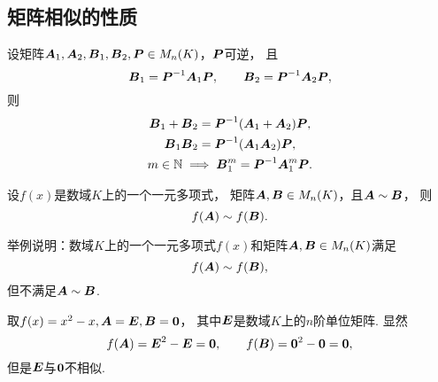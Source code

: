 \subsection{矩阵相似的性质}
\begin{proposition}
设矩阵\(\boldsymbol{A}_1,\boldsymbol{A}_2,\boldsymbol{B}_1,\boldsymbol{B}_2,\boldsymbol{P} \in M_n(K)\)，\(\boldsymbol{P}\)可逆，
且\begin{equation*}
	\boldsymbol{B}_1=\boldsymbol{P}^{-1}\boldsymbol{A}_1\boldsymbol{P}, \qquad
	\boldsymbol{B}_2=\boldsymbol{P}^{-1}\boldsymbol{A}_2\boldsymbol{P},
\end{equation*}
则\begin{gather}
	\boldsymbol{B}_1 + \boldsymbol{B}_2 = \boldsymbol{P}^{-1} (\boldsymbol{A}_1 + \boldsymbol{A}_2) \boldsymbol{P}, \\
	\boldsymbol{B}_1 \boldsymbol{B}_2 = \boldsymbol{P}^{-1} (\boldsymbol{A}_1 \boldsymbol{A}_2) \boldsymbol{P}, \\
	m\in\mathbb{N} \implies \boldsymbol{B}_1^m = \boldsymbol{P}^{-1}\boldsymbol{A}_1^m\boldsymbol{P}.
		\label{equation:相似矩阵.利用相似性简化计算}
\end{gather}
\end{proposition}
\begin{corollary}\label{theorem:相似矩阵.相似矩阵的多项式相似}
设\(f(x)\)是数域\(K\)上的一个一元多项式，
矩阵\(\boldsymbol{A},\boldsymbol{B} \in M_n(K)\)，且\(\boldsymbol{A} \sim \boldsymbol{B}\)，
则\begin{equation*}
	f(\boldsymbol{A}) \sim f(\boldsymbol{B}).
\end{equation*}
\end{corollary}
\begin{example}
举例说明：数域\(K\)上的一个一元多项式\(f(x)\)和矩阵\(\boldsymbol{A},\boldsymbol{B} \in M_n(K)\)满足\begin{equation*}
	f(\boldsymbol{A}) \sim f(\boldsymbol{B}),
\end{equation*}
但不满足\(\boldsymbol{A} \sim \boldsymbol{B}\).
\begin{solution}
取\(f(x) = x^2 - x,
\boldsymbol{A} = \boldsymbol{E},
\boldsymbol{B} = \boldsymbol0\)，
其中\(\boldsymbol{E}\)是数域\(K\)上的\(n\)阶单位矩阵.
显然\begin{equation*}
	f(\boldsymbol{A}) = \boldsymbol{E}^2 - \boldsymbol{E} = \boldsymbol0,
	\qquad
	f(\boldsymbol{B}) = \boldsymbol0^2 - \boldsymbol0 = \boldsymbol0,
\end{equation*}
但是\(\boldsymbol{E}\)与\(\boldsymbol0\)不相似.
\end{solution}
\end{example}

